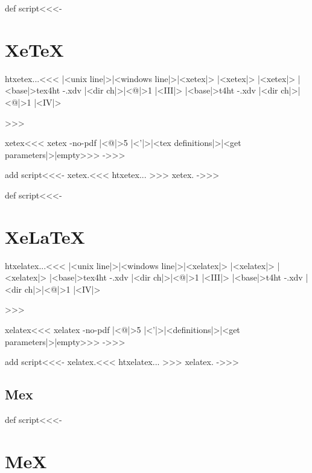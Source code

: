 \documentclass{article}
\begin{document}
\<def script\><<<-

\section{XeTeX}


\<htxetex...\><<<
|<unix line|>|<windows line|>|<xetex|>
        |<xetex|>
        |<xetex|>
        |<base|>tex4ht -.xdv |<dir ch|>|<@|>1 |<III|>
        |<base|>t4ht -.xdv |<dir ch|>|<@|>1 |<IV|>

>>>

\<xetex\><<<
xetex -no-pdf |<@|>5 |<'|>|<tex definitions|>|<get parameters|>|empty>>>
->>>


\<add script\><<<-
\<\pref xetex.\ext\><<<
\<htxetex...\>
>>> %
%
\OutputCodE\<\pref xetex.\ext\>      %
%
->>>



\<def script\><<<-
\section{XeLaTeX}


\<htxelatex...\><<<
|<unix line|>|<windows line|>|<xelatex|>
        |<xelatex|>
        |<xelatex|>
        |<base|>tex4ht -.xdv |<dir ch|>|<@|>1  |<III|>
        |<base|>t4ht -.xdv |<dir ch|>|<@|>1 |<IV|>

>>>


\<xelatex\><<<
xelatex -no-pdf |<@|>5 |<'|>|<definitions|>|<get parameters|>|empty>>>
->>>

\<add script\><<<-
\<\pref xelatex.\ext\><<<
\<htxelatex...\>
>>> %
%
\OutputCodE\<\pref xelatex.\ext\>      %
%
->>>


\subsection{Mex}


\<def script\><<<-

\section{MeX}
\end{document}
